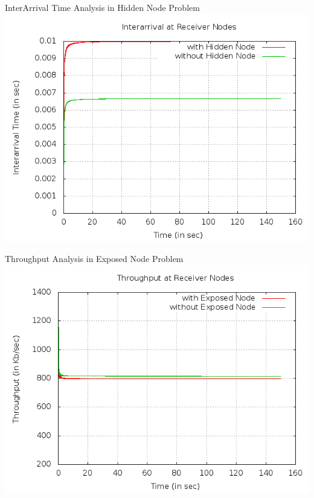 \documentclass[a4paper,12pt]{report}
\begin{document}
\begin{center}
InterArrival Time Analysis in Hidden Node Problem
 \includegraphics[width=15 cm,height=13 cm]{./hidden_interarrival.png}


\end{center}
\begin{center}
Throughput Analysis in Exposed Node Problem
 \includegraphics[width=15 cm,height=15 cm]{./exposed_throughput.png}


\end{center}
\end{document}
